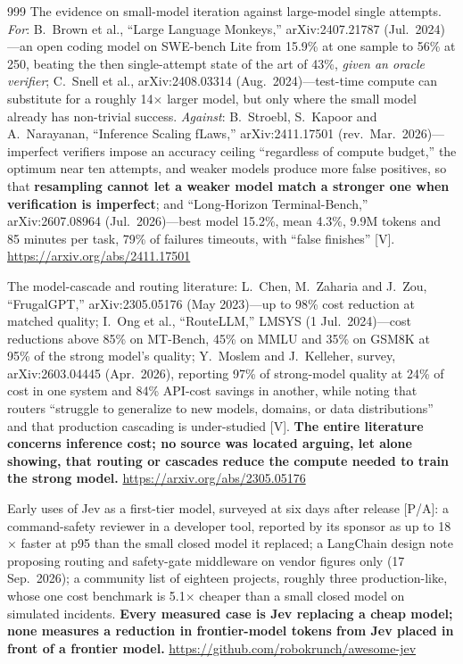 \begin{thebibliography}{999}
 The evidence on small-model iteration against large-model single attempts. \emph{For}: B.~Brown et al., ``Large Language Monkeys,'' arXiv:2407.21787 (Jul.\ 2024)---an open coding model on SWE-bench Lite from 15.9\% at one sample to 56\% at 250, beating the then single-attempt state of the art of 43\%, \emph{given an oracle verifier}; C.~Snell et al., arXiv:2408.03314 (Aug.\ 2024)---test-time compute can substitute for a roughly 14$\times$ larger model, but only where the small model already has non-trivial success. \emph{Against}: B.~Stroebl, S.~Kapoor and A.~Narayanan, ``Inference Scaling fLaws,'' arXiv:2411.17501 (rev.\ Mar.\ 2026)---imperfect verifiers impose an accuracy ceiling ``regardless of compute budget,'' the optimum near ten attempts, and weaker models produce more false positives, so that \textbf{resampling cannot let a weaker model match a stronger one when verification is imperfect}; and ``Long-Horizon Terminal-Bench,'' arXiv:2607.08964 (Jul.\ 2026)---best model 15.2\%, mean 4.3\%, 9.9M tokens and 85 minutes per task, 79\% of failures timeouts, with ``false finishes'' [V]. \url{https://arxiv.org/abs/2411.17501}

 The model-cascade and routing literature: L.~Chen, M.~Zaharia and J.~Zou, ``FrugalGPT,'' arXiv:2305.05176 (May 2023)---up to 98\% cost reduction at matched quality; I.~Ong et al., ``RouteLLM,'' LMSYS (1 Jul.\ 2024)---cost reductions above 85\% on MT-Bench, 45\% on MMLU and 35\% on GSM8K at 95\% of the strong model's quality; Y.~Moslem and J.~Kelleher, survey, arXiv:2603.04445 (Apr.\ 2026), reporting 97\% of strong-model quality at 24\% of cost in one system and 84\% API-cost savings in another, while noting that routers ``struggle to generalize to new models, domains, or data distributions'' and that production cascading is under-studied [V]. \textbf{The entire literature concerns inference cost; no source was located arguing, let alone showing, that routing or cascades reduce the compute needed to train the strong model.} \url{https://arxiv.org/abs/2305.05176}

 Early uses of Jev as a first-tier model, surveyed at six days after release [P/A]: a command-safety reviewer in a developer tool, reported by its sponsor as up to 18$\times$ faster at p95 than the small closed model it replaced; a LangChain design note proposing routing and safety-gate middleware on vendor figures only (17 Sep.\ 2026); a community list of eighteen projects, roughly three production-like, whose one cost benchmark is 5.1$\times$ cheaper than a small closed model on simulated incidents. \textbf{Every measured case is Jev replacing a cheap model; none measures a reduction in frontier-model tokens from Jev placed in front of a frontier model.} \url{https://github.com/robokrunch/awesome-jev}


\end{thebibliography}

